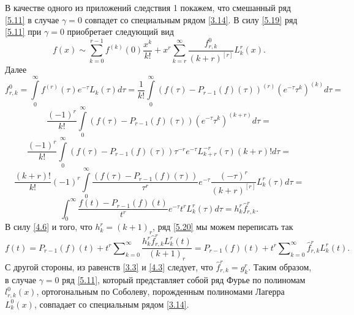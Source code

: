 В качестве одного из приложений следствия 1 покажем, что
 смешанный ряд \eqref{5.11} в случае $\gamma=0$ совпадет со специальным рядом \eqref{3.14}.  В силу \eqref{5.19} ряд \eqref{5.11} при $\gamma=0$ приобретает следующий вид
\begin{equation}\label{5.20}
f(x)\sim \sum_{k=0}^{r-1} f^{(k)}(0)\frac{x^k}{k!}+ x^{r}\sum_{k=r}^\infty  \frac{f_{r,k}^0}{(k+r)^{[r]}} L_{k}^{r}(x).
\end{equation}
Далее
\begin{equation*}
  {f}_{r,k}^0=\int\limits_0^\infty f^{(r)}(\tau)e^{-\tau}L_k(\tau)d\tau=\frac1{k!}\int\limits_0^\infty(f(\tau)-P_{r-1}(f)(\tau))^{(r)}(e^{-\tau}\tau^k)^{(k)}d\tau=
\end{equation*}
\begin{equation*}
  \frac{(-1)^r}{k!}\int\limits_0^\infty(f(\tau)-P_{r-1}(f)(\tau))(e^{-\tau}\tau^k)^{(k+r)}d\tau=
\end{equation*}
\begin{equation*}
  \frac{(-1)^r}{k!}\int\limits_0^\infty(f(\tau)-P_{r-1}(f)(\tau))\tau^{-r}e^{-\tau}L_{k+r}^{-r}(\tau)(k+r)!d\tau=
\end{equation*}
\begin{equation*}
  \frac{(k+r)!}{k!}(-1)^r\int\limits_0^\infty\frac{(f(\tau)-P_{r-1}(f)(\tau))}{\tau^r}e^{-\tau}\frac{(-\tau)^r}{(k+r)^{[r]}}L_k^r(\tau)d\tau=
\end{equation*}
\begin{equation}\label{4.6}
  \int_0^\infty\frac{f(t)-P_{r-1}(f)(t)}{t^r}e^{-\tau}t^rL_k^r(\tau)d\tau=h_k^r\hat{f}_{r,k}^r.
\end{equation}
В силу \eqref{4.6} и того, что  $h_k^r=(k+1)_r$, ряд \eqref{5.20} мы можем переписать так
\begin{equation*}
  f(t)=P_{r-1}(f)(t)+t^r\sum\nolimits_{k=0}^\infty\frac{h_k^r\hat{f}_{r,k}^rL_k^r(t)}{(k+1)_r}=
  P_{r-1}(f)(t)+t^r\sum\nolimits_{k=0}^\infty\hat{f}_{r,k}^rL_k^r(t).
\end{equation*}
 С другой стороны, из равенств \eqref{3.3} и \eqref{4.3} следует, что $\hat{f}_{r,k}^r=g_k^r$. Таким образом, в случае $\gamma=0$ ряд  \eqref{5.11}, который представляет собой ряд Фурье по полиномам $l_{r,k}^{0}(x)$, ортогональным по Соболеву, порожденным полиномами Лагерра $L_k^0(x)$,   совпадает со специальным рядом \eqref{3.14}.




